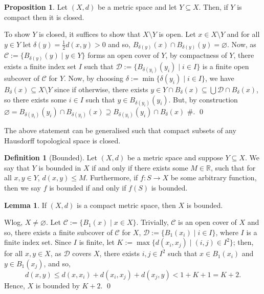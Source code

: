\documentclass[
]{article}
\theoremstyle{definition}
\newtheorem{prop}{Proposition}
\theoremstyle{definition}
\newtheorem{definition}{Definition}[section]
\newtheorem{lemma}{Lemma}[section]
\begin{document}
\begin{prop}\label{closed_of_compact}
  Let \((X, d)\) be a metric space and let \(Y \subseteq X\). Then, if \(Y\) is 
  compact then it is closed.
\end{prop}
\proof

To show \(Y\) is closed, it suffices to show that \(X \setminus Y\) is
open. Let \(x \in X \setminus Y\) and for all \(y \in Y\) let
\(\delta(y) =  \frac{1}{2}d(x, y) > 0\) and so,
\(B_{\delta(y)}(x) \cap B_{\delta(y)}(y) = \varnothing\). Now, as
\(\mathcal{C} := \{B_{\delta(y)}(y) \mid y \in Y\}\) forms an open cover
of \(Y\), by compactness of \(Y\), there exists a finite index set \(I\)
such that \(\mathcal{D} := \{B_{\delta(y_i)}(y_i) \mid i \in I\}\) is a
finite open subcover of \(\mathcal{C}\) for \(Y\). Now, by choosing
\(\delta := \min \{\delta(y_i) \mid i \in I\}\), we have
\(B_\delta(x) \subseteq X \setminus Y\) since if otherwise, there exists
\(y \in Y \cap B_\delta(x) \subseteq \bigcup \mathcal{D} \cap B_\delta(x)\),
so there exists some \(i \in I\) such that
\(y \in B_{\delta(y_i)}(y_i)\). But, by construction
\(\varnothing = B_{\delta(y_i)}(y_i) \cap B_{\delta(y_i)}(x)  \supseteq B_{\delta(y_i)}(y_i) \cap B_{\delta}(x)\)
\#. \qed

The above statement can be generalised such that compact subsets of any
Hausdorff topological space is closed.

\begin{definition}[Bounded]
  Let \((X, d)\) be a metric space and suppose \(Y \subseteq X\). We say that 
  \(Y\) is bounded in \(X\) if and only if there exists some \(M \in \mathbb{R}\), 
  such that for all \(x, y \in Y\), \(d(x, y) \le M\). Furthermore, if 
  \(f : S \to X\) be some arbitrary function, then we say \(f\) is bounded if 
  and only if \(f(S)\) is bounded.
\end{definition}

\begin{lemma}
  If \((X, d)\) is a compact metric space, then \(X\) is bounded.
\end{lemma}
\proof

Wlog, \(X \neq \varnothing\). Let
\(\mathcal{C} := \{B_1(x) \mid x \in X\}\). Trivially, \(\mathcal{C}\)
is an open cover of \(X\) and so, there exists a finite subcover of
\(\mathcal{C}\) for \(X\),
\(\mathcal{D} := \{B_1(x_i) \mid i \in I \}\), where \(I\) is a finite
index set. Since \(I\) is finite, let
\(K := \max \{d(x_i, x_j) \mid (i, j) \in I^2\}\); then, for all
\(x, y \in X\), as \(\mathcal{D}\) covers \(X\), there exists
\(i, j \in I^2\) such that \(x \in B_1(x_i)\) and \(y \in B_1(x_j)\),
and so,
\[d(x, y) \le d(x, x_i) + d(x_i, x_j) + d(x_j, y) < 1 + K + 1 = K + 2.\]
Hence, \(X\) is bounded by \(K + 2\). \qed
\end{document}
